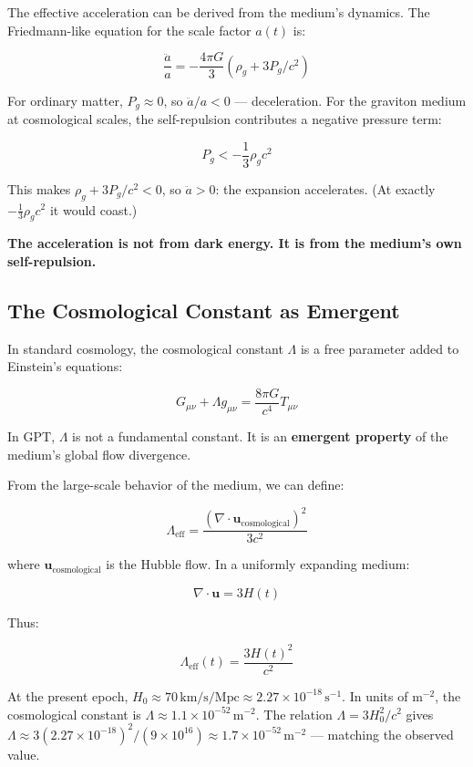 \documentclass[12pt, a4paper]{article}
\begin{document}
The effective acceleration can be derived from the medium's dynamics. The Friedmann-like equation for the scale factor \( a(t) \) is:

\[
\frac{\ddot{a}}{a} = -\frac{4\pi G}{3} (\rho_g + 3P_g/c^2)
\]

For ordinary matter, \( P_g \approx 0 \), so \( \ddot{a}/a < 0 \) — deceleration. For the graviton medium at cosmological scales, the self-repulsion contributes a negative pressure term:

\[
P_g < -\frac{1}{3} \rho_g c^2
\]

This makes \( \rho_g + 3P_g/c^2 < 0 \), so \( \ddot{a} > 0 \): the expansion accelerates. (At exactly \( -\tfrac{1}{3}\rho_g c^2 \) it would coast.)

\textbf{The acceleration is not from dark energy. It is from the medium's own self-repulsion.}

\subsection{The Cosmological Constant as Emergent}
\label{subsec:lambda_emergent}

In standard cosmology, the cosmological constant \( \Lambda \) is a free parameter added to Einstein's equations:

\[
G_{\mu\nu} + \Lambda g_{\mu\nu} = \frac{8\pi G}{c^4} T_{\mu\nu}
\]

In GPT, \( \Lambda \) is not a fundamental constant. It is an \textbf{emergent property} of the medium's global flow divergence.

From the large-scale behavior of the medium, we can define:

\[
\Lambda_{\text{eff}} = \frac{\left(\nabla \cdot \mathbf{u}_{\text{cosmological}}\right)^2}{3c^2}
\]

where \( \mathbf{u}_{\text{cosmological}} \) is the Hubble flow. In a uniformly expanding medium:

\[
\nabla \cdot \mathbf{u} = 3H(t)
\]

Thus:

\[
\Lambda_{\text{eff}}(t) = \frac{3H(t)^2}{c^2}
\]

At the present epoch, \( H_0 \approx 70 \, \text{km/s/Mpc} \approx 2.27 \times 10^{-18} \, \text{s}^{-1} \). In units of \( \text{m}^{-2} \), the cosmological constant is \( \Lambda \approx 1.1 \times 10^{-52} \, \text{m}^{-2} \). The relation \( \Lambda = 3H_0^2/c^2 \) gives \( \Lambda \approx 3(2.27 \times 10^{-18})^2 / (9 \times 10^{16}) \approx 1.7 \times 10^{-52} \, \text{m}^{-2} \) — matching the observed value.
\end{document}
